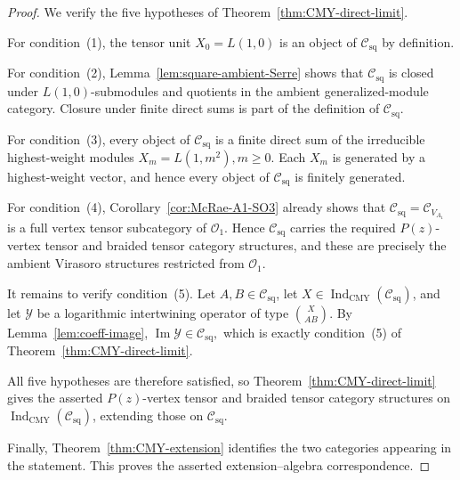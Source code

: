 \documentclass[12pt,leqno]{amsart}
\numberwithin{equation}{section} \newtheorem{thm}{Theorem}[section] \newtheorem{lem}[thm]{Lemma} \newtheorem{ex}[thm]{Example} \newtheorem{prop}[thm]{Proposition} \newtheorem{cor}[thm]{Corollary} \newtheorem{defi}[thm]{Definition} \newtheorem{rmk}[thm]{Remark} \newtheorem{notation}[thm]{Notation}
\newcommand{\Csq}{\mathcal C_{\mathrm{sq}}}
\newcommand{\Ovir}{\mathcal O_1}
\newcommand{\IndCMY}{\operatorname{Ind}_{\mathrm{CMY}}}
\begin{document}
\begin{proof}
We verify the five hypotheses of Theorem~\ref{thm:CMY-direct-limit}.

For condition~(1), the tensor unit \(X_0=L(1,0)\) is an object of $\Csq$ by definition.

For condition~(2), Lemma~\ref{lem:square-ambient-Serre} shows that $\Csq$ is closed under $L(1,0)$-submodules and quotients in the ambient generalized-module category. Closure under finite direct sums is part of the definition of $\Csq$.

For condition~(3), every object of $\Csq$ is a finite direct sum of the irreducible highest-weight modules \(X_m=L(1,m^2),m\ge0.\) Each $X_m$ is generated by a highest-weight vector, and hence every object of $\Csq$ is finitely generated.

For condition~(4), Corollary~\ref{cor:McRae-A1-SO3} already shows that $\Csq=\mathcal C_{V_{A_1}}$ is a full vertex tensor subcategory of $\Ovir$. Hence $\Csq$ carries the required $P(z)$-vertex tensor and braided tensor category structures, and these are precisely the ambient Virasoro structures restricted from $\Ovir$.

It remains to verify condition~(5). Let $A,B\in\Csq$, let $X\in\IndCMY(\Csq)$, and let $\mathcal Y$ be a logarithmic intertwining operator of type \(\binom{X}{A B}.\) By Lemma~\ref{lem:coeff-image}, \(\operatorname{Im}\mathcal Y\in\Csq,\) which is exactly condition~(5) of Theorem~\ref{thm:CMY-direct-limit}.

All five hypotheses are therefore satisfied, so Theorem~\ref{thm:CMY-direct-limit} gives the asserted $P(z)$-vertex tensor and braided tensor category structures on $\IndCMY(\Csq)$, extending those on $\Csq$.

Finally, Theorem~\ref{thm:CMY-extension} identifies the two categories appearing in the statement. This proves the asserted extension--algebra correspondence.
\end{proof}
\end{document}
